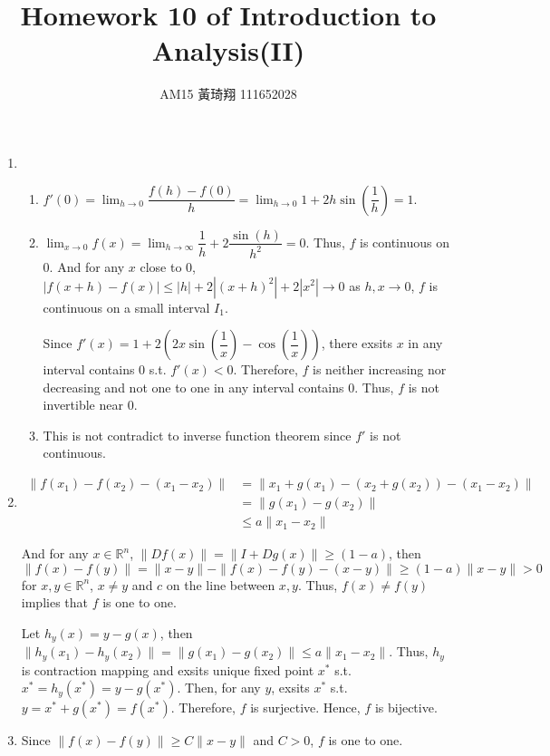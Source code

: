 \documentclass[12pt]{article}
\title{Homework 10 of Introduction to Analysis(II)}
\author{AM15 黃琦翔 111652028}
\begin{document}
\maketitle
\begin{enumerate}
    \item \begin{enumerate}
        \item $f'(0) = \displaystyle\lim_{h\to 0} \dfrac{f(h) - f(0)}{h} = \displaystyle\lim_{h\to 0} 1 + 2h\sin(\dfrac{1}{h}) = 1$.
        
        \item $\displaystyle\lim_{x\to 0} f(x) = \displaystyle\lim_{h\to \infty} \dfrac{1}{h} + 2\dfrac{\sin(h)}{h^2} = 0$.
        Thus, $f$ is continuous on $0$.
        And for any $x$ close to $0$, $|f(x+h) - f(x)| \leq |h| + 2|(x+h)^2| + 2|x^2| \to 0$ as $h, x \to 0$, $f$ is continuous on a small interval $I_1$.

        Since $f'(x) = 1 + 2(2x\sin(\dfrac{1}{x}) - \cos(\dfrac{1}{x}))$, there exsits $x$ in any interval contains $0$ s.t. $f'(x)< 0$.
        Therefore, $f$ is neither increasing nor decreasing and not one to one in any interval contains $0$.
        Thus, $f$ is not invertible near $0$.

        \item This is not contradict to inverse function theorem since $f'$ is not continuous.
    \end{enumerate}

    \item \begin{align*}
        \| f(x_1) - f(x_2) - (x_1 - x_2)\| &= \| x_1 + g(x_1) - (x_2 + g(x_2)) - (x_1 - x_2) \| \\
        &= \| g(x_1) - g(x_2)\|\\
        &\leq a\| x_1 - x_2\|
    \end{align*}

    And for any $x\in \mathbb{R}^n$, $\|Df(x)\| = \|I + Dg(x)\| \geq (1-a)$,
    then $\| f(x) - f(y)\| = \|x-y\| - \| f(x) - f(y) - (x-y)\| \geq (1-a)\|x-y\| > 0$ for $x, y\in \mathbb{R}^n$, $x\neq y$ and $c$ on the line between $x, y$.
    Thus, $f(x) \neq f(y)$ implies that $f$ is one to one.

    Let $h_y(x) = y - g(x)$, then $\| h_y(x_1) - h_y(x_2)\| = \| g(x_1) - g(x_2) \| \leq a\|x_1 - x_2\|$.
    Thus, $h_y$ is contraction mapping and exsits unique fixed point $x^*$ s.t. $x^* = h_y(x^*) = y - g(x^*)$.
    Then, for any $y$, exsits $x^*$ s.t. $y = x^* + g(x^*) = f(x^*)$.
    Therefore, $f$ is surjective.
    Hence, $f$ is bijective.
   
    \item Since $\|f(x) - f(y) \| \geq C\| x-y \|$ and $C > 0$, $f$ is one to one.
    
\end{enumerate}
\end{document}

